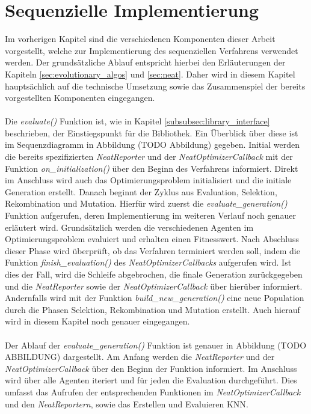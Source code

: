 \section{Sequenzielle Implementierung}
\label{sec:sequential_implementation}
Im vorherigen Kapitel sind die verschiedenen Komponenten dieser Arbeit vorgestellt, welche zur Implementierung des sequenziellen Verfahrens verwendet werden. Der grundsätzliche Ablauf entspricht hierbei den Erläuterungen der Kapiteln \ref{sec:evolutionary_algos} und \ref{sec:neat}. Daher wird in diesem Kapitel hauptsächlich auf die technische Umsetzung sowie das Zusammenspiel der bereits vorgestellten Komponenten eingegangen. 
\\\\
Die \emph{evaluate()} Funktion ist, wie in Kapitel \ref{subsubsec:library_interface} beschrieben, der Einstiegspunkt für die Bibliothek. Ein Überblick über diese ist im Sequenzdiagramm in Abbildung (TODO Abbildung) gegeben. Initial werden die bereits spezifizierten \emph{NeatReporter} und der \emph{NeatOptimizerCallback} mit der Funktion \emph{on\_initialization()} über den Beginn des Verfahrens informiert. Direkt im Anschluss wird auch das Optimierungsproblem initialisiert und die initiale Generation erstellt. Danach beginnt der Zyklus aus Evaluation, Selektion, Rekombination und Mutation. Hierfür wird zuerst die \emph{evaluate\_generation()} Funktion aufgerufen, deren Implementierung im weiteren Verlauf noch genauer erläutert wird. Grundsätzlich werden die verschiedenen Agenten im Optimierungsproblem evaluiert und erhalten einen Fitnesswert. Nach Abschluss dieser Phase wird überprüft, ob das Verfahren terminiert werden soll, indem die Funktion \emph{finish\_evaluation()} des \emph{NeatOptimizerCallbacks} aufgerufen wird. Ist dies der Fall, wird die Schleife abgebrochen, die finale Generation zurückgegeben und die \emph{NeatReporter} sowie der \emph{NeatOptimizerCallback} über hierüber informiert. Andernfalls wird mit der Funktion \emph{build\_new\_generation()} eine neue Population durch die Phasen Selektion, Rekombination und Mutation erstellt. Auch hierauf wird in diesem Kapitel noch genauer eingegangen. 
\\\\
Der Ablauf der \emph{evaluate\_generation()} Funktion ist genauer in Abbildung (TODO ABBILDUNG) dargestellt. Am Anfang werden die \emph{NeatReporter} und der \emph{NeatOptimizerCallback} über den Beginn der Funktion informiert. Im Anschluss wird über alle Agenten iteriert und für jeden die Evaluation durchgeführt. Dies umfasst das Aufrufen der entsprechenden Funktionen im \emph{NeatOptimizerCallback} und den \emph{NeatReportern}, sowie das Erstellen und Evaluieren \ac{KNN}.
